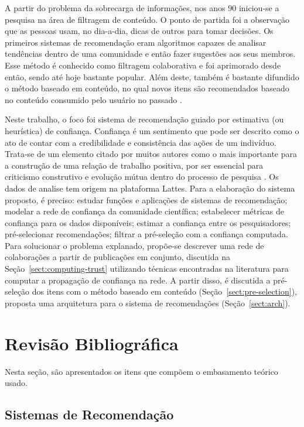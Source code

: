 \documentclass[12pt]{article}
\begin{document}
A partir do problema da sobrecarga de informações, nos anos 90 iniciou-se a pesquisa na área de filtragem de conteúdo. O ponto de partida foi a observação que as pessoas usam, no dia-a-dia, dicas de outros para tomar decisões. Os primeiros sistemas de recomendação eram algoritmos capazes de analisar tendências dentro de uma  comunidade e então fazer sugestões aos seus membros. Esse método é conhecido como filtragem colaborativa e foi aprimorado desde então, sendo até hoje bastante popular. Além deste, também é bastante difundido o método baseado em conteúdo, no qual novos itens são recomendados baseado no conteúdo consumido pelo usuário no passado \cite{ricci2011introduction}.

Neste trabalho, o foco foi sistema de recomendação guiado por estimativa (ou heurística) de confiança. Confiança é um sentimento que pode ser descrito como o ato de contar com a credibilidade e consistência das ações de um indivíduo. Trata-se de um elemento citado por muitos autores como o mais importante para a construção de uma relação de trabalho positiva, por ser essencial para criticismo construtivo e evolução mútua dentro do processo de pesquisa \cite{bagshaw2007international}. Os dados de analise tem origem na plataforma Lattes. Para a elaboração do sistema proposto, é preciso: estudar funções e aplicações de sistemas de recomendação; modelar a rede de confiança da comunidade científica; estabelecer métricas de confiança para os dados disponíveis; estimar a confiança entre os pesquisadores; pré-selecionar recomendações; filtrar a pré-seleção com a confiança computada. Para solucionar o problema explanado, propõe-se descrever uma rede de colaborações a partir de publicações em conjunto, discutida na Seção~\ref{sect:computing-trust} utilizando técnicas encontradas na literatura para computar a propagação de confiança na rede. A partir disso, é discutida a pré-seleção dos itens com o método baseado em conteúdo (Seção~\ref{sect:pre-selection}), proposta uma arquitetura para o sistema de recomendações (Seção~\ref{sect:arch}).

\section{Revisão Bibliográfica}

Nesta seção, são apresentados os itens que compõem o embasamento teórico usado.

\subsection{Sistemas de Recomendação}
\end{document}
